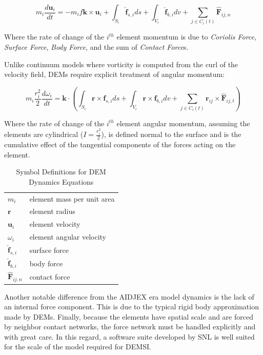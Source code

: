 \begin{equation}
m_i\frac{d\mathbf{u}_i}{dt}=-m_if\mathbf{k}\times\mathbf{u}_i+\int_{S_i}\check{\mathbf{f}}_{s,i}ds+\int_{V_i}\check{\mathbf{f}}_{b,i}dv+\sum_{j\in C_i(t)}\hat{\mathbf{F}}_{ij,n}
\label{eq:DEM_Linear_Momentun}
\end{equation}

Where the rate of change of the $i^{th}$ element momentum is due to \textit{Coriolis Force}, \textit{Surface Force}, \textit{Body Force}, and the sum of \textit{Contact Force}s.

Unlike continuum models where vorticity is computed from the curl of the velocity field, \acp{DEM} require explicit treatment of angular momentum:

\begin{equation}
m_i\frac{r_i^2}{2}\frac{d\omega_i}{dt}=\mathbf{k}\cdot\left(\int_{S_i}\mathbf{r}\times \mathbf{f}_{s,i}ds+\int_{V_i}\mathbf{r}\times \mathbf{f}_{b,i}dv+\sum_{j\in C_{i}(t)}\mathbf{r}_{ij}\times \hat{\mathbf{F}}_{ij,t}\right)
\label{eq:DEM_Angular_Momentum}
\end{equation}

Where the rate of change of the $i^{th}$ element angular momentum, assuming the elements are cylindrical ($I = \frac{r_i^2}{2}$), is defined normal to the surface and is the cumulative effect of the tangential components of the forces acting on the element.

\begin{table}
	[H]
	\caption{Symbol Definitions for \ac{DEM} Dynamics Equations}
	\centering
	\begin{tabular}{ll}
	\hline
	$m_i$ & element mass per unit area \\
	$\mathbf{r}$ & element radius \\
	$\mathbf{u}_i$ & element velocity \\
	$\omega_i$ & element angular velocity \\
	$\check{\mathbf{f}}_{s,i}$ & surface force \\
	$\check{\mathbf{f}}_{b,i}$ & body force \\
	$\hat{\mathbf{F}}_{ij,n}$ & contact force \\
	\hline
	\end{tabular}
\end{table}

Another notable difference from the \ac{AIDJEX} era model dynamics is the lack of an internal force component.  This is due to the typical rigid body approximation made by \acp{DEM}.  Finally, because the elements have spatial scale and are forced by neighbor contact networks, the force network must be handled explicitly and with great care.  In this regard, a software suite developed by \ac{SNL} is well suited for the scale of the model required for \ac{DEMSI}.

